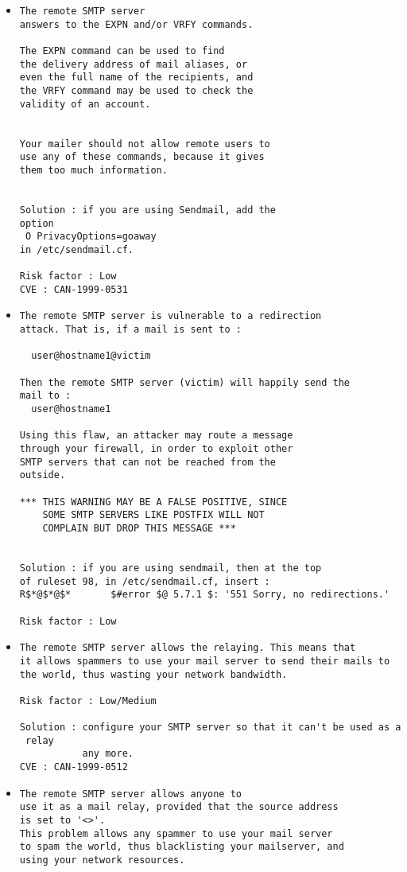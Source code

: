 \documentclass{article}
\begin{document}
\begin{itemize}
\item \begin{verbatim}
The remote SMTP server
answers to the EXPN and/or VRFY commands.

The EXPN command can be used to find 
the delivery address of mail aliases, or 
even the full name of the recipients, and 
the VRFY command may be used to check the 
validity of an account.


Your mailer should not allow remote users to
use any of these commands, because it gives
them too much information.


Solution : if you are using Sendmail, add the 
option
 O PrivacyOptions=goaway
in /etc/sendmail.cf.

Risk factor : Low
CVE : CAN-1999-0531
\end{verbatim}\item \begin{verbatim}
The remote SMTP server is vulnerable to a redirection
attack. That is, if a mail is sent to :

  user@hostname1@victim
  
Then the remote SMTP server (victim) will happily send the
mail to :
  user@hostname1
  
Using this flaw, an attacker may route a message
through your firewall, in order to exploit other
SMTP servers that can not be reached from the
outside.

*** THIS WARNING MAY BE A FALSE POSITIVE, SINCE
    SOME SMTP SERVERS LIKE POSTFIX WILL NOT
    COMPLAIN BUT DROP THIS MESSAGE ***
    
    
Solution : if you are using sendmail, then at the top
of ruleset 98, in /etc/sendmail.cf, insert :
R$*@$*@$*       $#error $@ 5.7.1 $: '551 Sorry, no redirections.'

Risk factor : Low
\end{verbatim}\item \begin{verbatim}
The remote SMTP server allows the relaying. This means that
it allows spammers to use your mail server to send their mails to
the world, thus wasting your network bandwidth.

Risk factor : Low/Medium

Solution : configure your SMTP server so that it can't be used as a
 relay
           any more.
CVE : CAN-1999-0512
\end{verbatim}\item \begin{verbatim}
The remote SMTP server allows anyone to
use it as a mail relay, provided that the source address 
is set to '<>'. 
This problem allows any spammer to use your mail server 
to spam the world, thus blacklisting your mailserver, and
using your network resources.


\end{verbatim}
\end{itemize}
\end{document}
